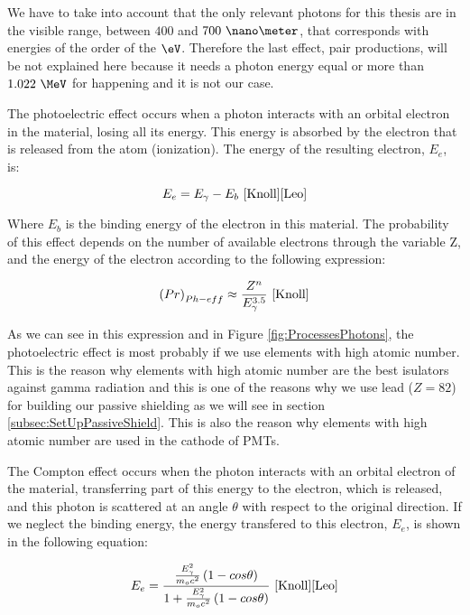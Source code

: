 We have to take into account that the only relevant photons for this thesis are in the visible range, between $400$ and $700~\nano\meter$, that corresponds with energies of the order of the $\eV$. Therefore the last effect, pair productions, will be not explained here because it needs a photon energy equal or more than $1.022~\MeV$ for happening and it is not our case.

The photoelectric effect occurs when a photon interacts with an orbital electron in the material, losing all its energy. This energy is absorbed by the electron that is released from the atom (ionization). The energy of the resulting electron, $E_e$, is:


\begin{equation}
E_e = E_\gamma - E_b ~\cite{Knoll}\cite{Leo}
\label{eq:PhotoelectricEffect}
\end{equation}

Where $E_b$ is the binding energy of the electron in this material. The probability of this effect depends on the number of available electrons through the variable Z, and the energy of the electron according to the following expression:

\begin{equation}
\left(Pr\right)_{Ph-eff} \approx \frac{Z^n}{E_\gamma^{3.5}}~\cite{Knoll}
\label{eq:PhotoelectricProb}
\end{equation}

As we can see in this expression and in Figure \ref{fig:ProcessesPhotons}, the photoelectric effect is most probably if we use elements with high atomic number. This is the reason why elements with high atomic number are the best isulators against gamma radiation and this is one of the reasons why we use lead ($Z=82$) for building our passive shielding as we will see in section \ref{subsec:SetUpPassiveShield}. This is also the reason why elements with high atomic number are used in the cathode of PMTs. 

The Compton effect occurs when the photon interacts with an orbital electron of the material, transferring part of this energy to the electron, which is released, and this photon is scattered at an angle $\theta$ with respect to the original direction. If we neglect the binding energy, the energy transfered to this electron, $E_e$, is shown in the following equation:

\begin{equation}
E_e=\frac{\frac{E_\gamma^2}{m_oc^2}\left(1-cos\theta\right)}{1+ \frac{E_\gamma^2}{m_oc^2}\left(1-cos\theta\right)}~\cite{Knoll}\cite{Leo}
\label{eq:ComptonEffect}
\end{equation}

